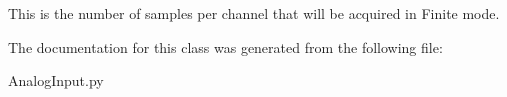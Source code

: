This is the number of samples per channel that will be acquired in Finite mode. 



The documentation for this class was generated from the following file\-:\begin{DoxyCompactItemize}
\item 
Analog\-Input.\-py\end{DoxyCompactItemize}
